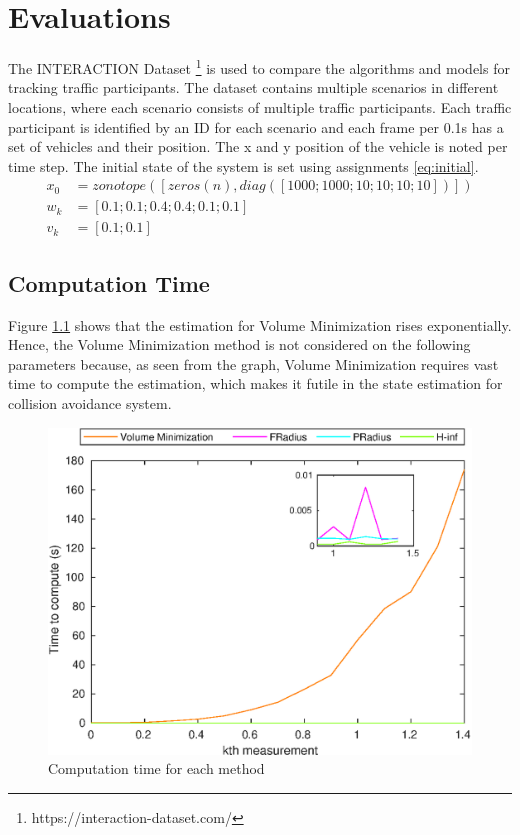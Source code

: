 \chapter{Evaluations} \label{ch:result}
The INTERACTION Dataset \footnote{https://interaction-dataset.com/} is used to compare the algorithms and models for tracking traffic participants. The dataset contains multiple scenarios in different locations, where each scenario consists of multiple traffic participants. Each traffic participant is identified by an ID for each scenario and each frame per 0.1s has a set of vehicles and their position. The x and y position of the vehicle is noted per time step. The initial state of the system is set using assignments \eqref{eq:initial}.
\begin{equation}
\label{eq:initial}
\begin{split}
x_0 &= zonotope([zeros(n), diag([1000;1000;10;10;10;10])])\\
w_k &= [0.1;0.1;0.4;0.4;0.1;0.1]\\
v_k &= [0.1;0.1]
\end{split}
\end{equation}

\section{Computation Time}
Figure \ref{fig:timegraph} shows that the estimation for Volume Minimization rises exponentially. Hence, the Volume Minimization method is not considered on the following parameters because, as seen from the graph, Volume Minimization requires vast time to compute the estimation, which makes it futile in the state estimation for collision avoidance system.

\begin{figure}
\label{fig:timegraph}
\centering
\includegraphics[width=.8\linewidth]{figures/timegraphh}
\caption{Computation time for each method}
\end{figure}

